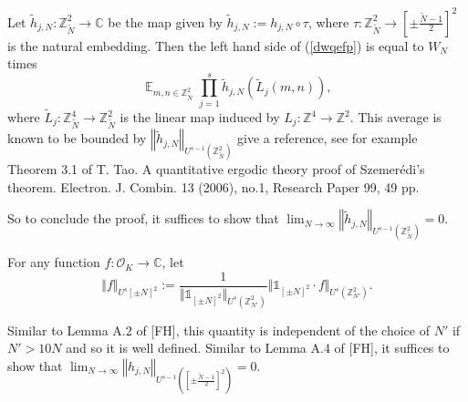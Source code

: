 \documentclass[11pt]{amsart}
\theoremstyle{definition}
\DeclareMathOperator*{\E}{\mathbb{E}}
\newcommand{\C}{{\mathbb C}}
\newcommand{\NN}{{\mathcal N}}
\newcommand{\Z}{{\mathbb Z}}
\newcommand{\norm}[1]{\left\Vert #1\right\Vert}
\begin{document}
Let $\tilde{h}_{j,N}\colon \Z_{\tilde{N}}^{2}\to\C$ be the map given by $\tilde{h}_{j,N}:=h_{j,N}\circ\tau$, where $\tau\colon \Z_{\tilde{N}}^{2}\to \left[\pm\frac{\tilde{N}-1}{2}\right]^{2}$ is the natural embedding.
Then 
 the left hand side of (\ref{dwqefp}) is equal to $W_N$ times
    $$\E_{m,n \in  \Z_{\tilde{N}}^{2}} \prod_{j=1}^s \tilde{h}_{j,N}(\tilde{L}_j(m,n)),$$
    where $\tilde{L}_{j}\colon \Z_{\tilde{N}}^{4}\to \Z_{\tilde{N}}^{2}$ is the linear map induced by $L_{j}\colon \Z^{4}\to\Z^{2}$.
This average is known to be bounded by 
$\norm{\tilde{h}_{j,N}}_{U^{s-1}(\Z_{\tilde{N}}^{2})}$
{\color{red} give a reference, see for example
Theorem 3.1 of
T. Tao. A quantitative ergodic theory proof of Szemerédi’s theorem. Electron. J. Combin. 13
(2006), no.1, Research Paper 99, 49 pp.}

So to conclude the proof, it suffices to show that  $\lim_{N\to\infty}\norm{\tilde{h}_{j,N}}_{U^{s-1}(\Z_{\tilde{N}}^{2})}=0$.
\fi
\iffalse

For any function $f\colon \mathcal{O}_{K}\to\C$, let 
$$\Vert f\Vert_{U^{s}[\pm N]^{2}}:=\frac{1}{\Vert\mathds{1}_{[\pm N]^{2}}\Vert_{U^{s}(\Z_{N'}^{2})}}\Vert\mathds{1}_{[\pm N]^{2}}\cdot f\Vert_{U^{s}(\Z_{N'}^{2})}.$$


 

Similar to Lemma A.2 of [FH], this quantity is independent of the choice of $N'$ if $N'>10N$ and so it is well defined.
Similar to Lemma A.4 of  [FH], it suffices to show that 
$\lim_{N\to\infty}\norm{h_{j,N}}_{U^{s-1}([\pm\frac{\tilde{N}-1}{2}]^{2})}=0$.
\end{document}
